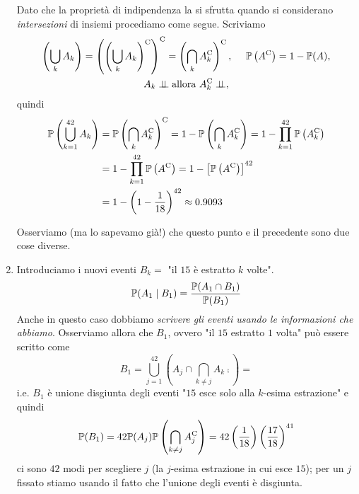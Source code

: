 \begin{enumerate}
	Dato che la proprietà di indipendenza la si sfrutta quando si considerano \textit{intersezioni} di insiemi procediamo come segue. Scriviamo
	\begin{gather*}
		\left(\bigcup _{k} A_{k}\right) =\left(\left(\bigcup _{k} A_{k}\right)^{\mathrm{C}}\right)^{\mathrm{C}} =\left(\bigcap _{k} A_{k}^{\mathrm{C}}\right)^{\mathrm{C}} ,\ \ \ \ \mathbb{P}\left( A^{\mathrm{C}}\right) =1-\mathbb{P}( A) ,\\
		A_{k} \perp \!\!\! \perp \text{allora} \ A_{k}^{\mathrm{C}} \perp \!\!\! \perp ,
	\end{gather*}
	quindi
	\begin{align*}
		\mathbb{P}\left(\bigcup _{k=1}^{42} A_{k}\right) & =\mathbb{P}\left(\bigcap _{k} A_{k}^{\mathrm{C}}\right)^{\mathrm{C}} =1-\mathbb{P}\left(\bigcap _{k} A_{k}^{\mathrm{C}}\right) =1-\prod _{k=1}^{42}\mathbb{P}\left( A_{k}^{\mathrm{C}}\right)\\
		 & =1-\prod _{k=1}^{42}\mathbb{P}\left( A^{\mathrm{C}}\right) =1-\left[\mathbb{P}\left( A^{\mathrm{C}}\right)\right]^{42}\\
		 & =1-\left( 1-\frac{1}{18}\right)^{42} \approx 0.9093
	\end{align*}

	\begin{oss}
		Osserviamo (ma lo sapevamo già!) che questo punto e il precedente sono due cose diverse.
	\end{oss}
	\item Introduciamo i nuovi eventi $B_{k} =$ "il $15$ è estratto $k$ volte".
	\begin{equation*}
		\mathbb{P}( A_{1} \mid B_{1}) =\frac{\mathbb{P}( A_{1} \cap B_{1})}{\mathbb{P}( B_{1})}
	\end{equation*}
	Anche in questo caso dobbiamo \textit{scrivere gli eventi usando le informazioni che abbiamo}. Osserviamo allora che $B_{1}$, ovvero "il $15$ estratto $1$ volta" può essere scritto come
	\begin{equation*}
		B_{1} =\bigcup _{j=1}^{42}\left( A_{j} \cap \bigcap _{k\neq j} A_{k}\comp\right) =
	\end{equation*}
	i.e. $B_{1}$ è unione disgiunta degli eventi "$15$ esce solo alla $k$-esima estrazione" e quindi
	\begin{equation*}
		\mathbb{P}( B_{1}) =42\mathbb{P}( A_{j})\mathbb{P}\left(\bigcap _{k\neq j} A_{j}^{\mathrm{C}}\right) =42\left(\frac{1}{18}\right)\left(\frac{17}{18}\right)^{41}
	\end{equation*}
	ci sono $42$ modi per scegliere $j$ (la $j$-esima estrazione in cui esce $15$); per un $j$ fissato stiamo usando il fatto che l'unione degli eventi è disgiunta.


\end{enumerate}
